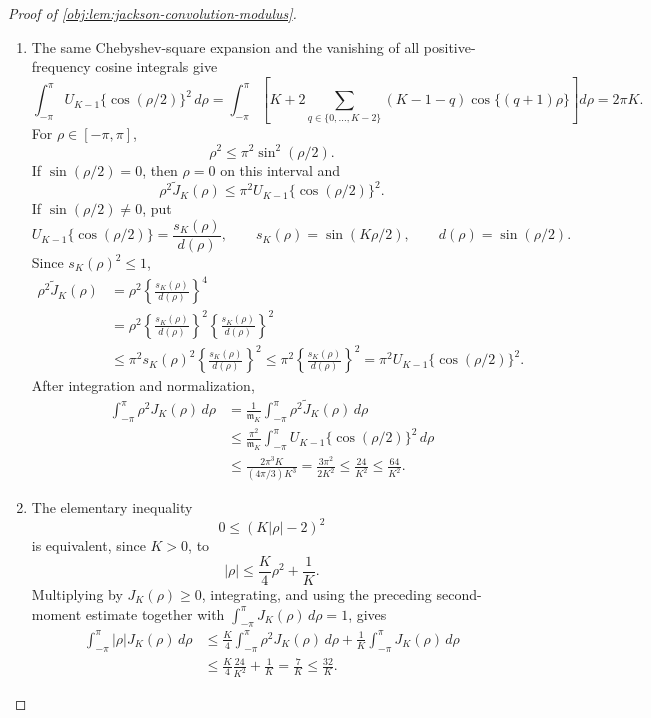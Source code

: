 \begin{proof}[Proof of \cref{obj:lem:jackson-convolution-modulus}]
\begin{enumerate}
\item The same Chebyshev-square expansion and the vanishing of all positive-frequency cosine integrals give
\[
\int_{-\pi}^{\pi}
U_{K-1}\{\cos(\rho/2)\}^2\,d\rho
=
\int_{-\pi}^{\pi}
\left[
K+2\sum_{q\in\{0,\ldots,K-2\}}(K-1-q)\cos\{(q+1)\rho\}
\right]d\rho
=
2\pi K .
\]
For \(\rho\in[-\pi,\pi]\),
\[
\rho^2\le \pi^2\sin^2(\rho/2).
\]
If \(\sin(\rho/2)=0\), then \(\rho=0\) on this interval and
\[
\rho^2\widetilde J_K(\rho)
\le
\pi^2U_{K-1}\{\cos(\rho/2)\}^2 .
\]
If \(\sin(\rho/2)\ne0\), put
\[
U_{K-1}\{\cos(\rho/2)\}=\frac{s_K(\rho)}{d(\rho)},
\qquad
s_K(\rho)=\sin(K\rho/2),
\qquad
d(\rho)=\sin(\rho/2).
\]
Since \(s_K(\rho)^2\le1\),
\[
\begin{aligned}
\rho^2\widetilde J_K(\rho)
&=
\rho^2\left\{\frac{s_K(\rho)}{d(\rho)}\right\}^4  \\
&=
\rho^2\left\{\frac{s_K(\rho)}{d(\rho)}\right\}^2
\left\{\frac{s_K(\rho)}{d(\rho)}\right\}^2  \\
&\le
\pi^2s_K(\rho)^2
\left\{\frac{s_K(\rho)}{d(\rho)}\right\}^2
\le
\pi^2
\left\{\frac{s_K(\rho)}{d(\rho)}\right\}^2
=
\pi^2U_{K-1}\{\cos(\rho/2)\}^2 .
\end{aligned}
\]
After integration and normalization,
\[
\begin{aligned}
\int_{-\pi}^{\pi}\rho^2J_K(\rho)\,d\rho
&=
\frac{1}{\mathfrak m_K}
\int_{-\pi}^{\pi}\rho^2\widetilde J_K(\rho)\,d\rho  \\
&\le
\frac{\pi^2}{\mathfrak m_K}
\int_{-\pi}^{\pi}U_{K-1}\{\cos(\rho/2)\}^2\,d\rho  \\
&\le
\frac{2\pi^3K}{(4\pi/3)K^3}
=
\frac{3\pi^2}{2K^2}
\le
\frac{24}{K^2}
\le
\frac{64}{K^2}.
\end{aligned}
\] %

\item The elementary inequality
\[
0\le (K|\rho|-2)^2
\]
is equivalent, since \(K>0\), to
\[
|\rho|\le \frac K4\rho^2+\frac1K .
\]
Multiplying by \(J_K(\rho)\ge0\), integrating, and using the preceding second-moment estimate together with \(\int_{-\pi}^{\pi}J_K(\rho)\,d\rho=1\), gives
\[
\begin{aligned}
\int_{-\pi}^{\pi}|\rho|J_K(\rho)\,d\rho
&\le
\frac K4\int_{-\pi}^{\pi}\rho^2J_K(\rho)\,d\rho
+
\frac1K\int_{-\pi}^{\pi}J_K(\rho)\,d\rho  \\
&\le
\frac K4\frac{24}{K^2}+\frac1K
=
\frac7K
\le
\frac{32}{K}.
\end{aligned}
\] %


\end{enumerate}
\end{proof}
